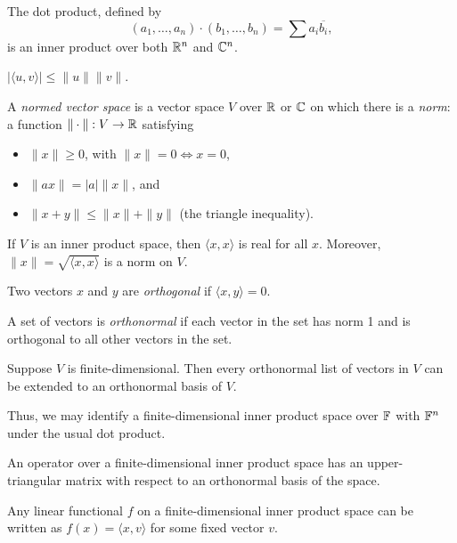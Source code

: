 \begin{prop}
  The dot product, defined by 
  \[(a_1,\ldots,a_n)\cdot(b_1,\ldots,b_n)=\sum a_i\overline{b_i},\]
  is an inner product over both $\mathbb{R}^n$ and $\mathbb{C}^n$.
\end{prop}
\begin{prop}
  $|\langle u,v\rangle|\le \|u\|\|v\|$.
\end{prop}
\begin{defn}
  A \emph{normed vector space} is a vector space $V$ over $\mathbb{R}$ or $\mathbb{C}$
  on which there is a \emph{norm}: a function $\|\cdot\|:V\to\mathbb{R}$ satisfying
  \begin{itemize}
    \item $\| x\|\ge 0$, with $\|x\|=0\iff x=0$,
    \item $\|a x\|=|a|\| x\|$, and
    \item $\| x+ y\|\le\| x\|+\| y\|$ (the triangle
      inequality).
  \end{itemize}
\end{defn}
\begin{prop}
  If $V$ is an inner product space, then $\langle x, x\rangle$ is
  real for all $ x$.
  Moreover, $\| x\|=\sqrt{\langle x, x\rangle}$ is a norm
  on $V$.
\end{prop}
\begin{defn}
  Two vectors $ x$ and $ y$ are \emph{orthogonal} if $\langle
   x, y\rangle=0$.

  A set of vectors is \emph{orthonormal} if each vector in the set has norm 1
  and is orthogonal to all other vectors in the set.
\end{defn}
\begin{prop}
  Suppose $V$ is finite-dimensional. Then every orthonormal list of vectors in
  $V$ can be extended to an orthonormal basis of $V$.
\end{prop}
\begin{rem}
  Thus, we may identify a finite-dimensional inner product space over $\mathbb{F}$ with
  $\mathbb{F}^n$ under the usual dot product.
\end{rem}
\begin{thm}
  An operator over a finite-dimensional inner product space has an
  upper-triangular matrix with respect to an orthonormal basis of the space.
\end{thm}
\begin{thm}
  Any linear functional $f$ on a finite-dimensional inner product space can be
  written as $f(x)=\langle x,v\rangle$ for some fixed vector $v$.
\end{thm}
